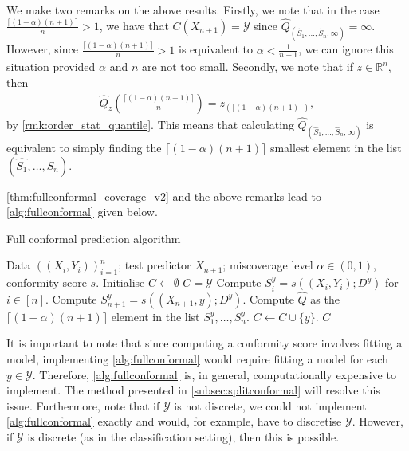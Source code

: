 \documentclass[11pt, titlepage]{article} %
\numberwithin{equation}{section}
\theoremstyle{definition}
\numberwithin{theorem}{section}
\numberwithin{lemma}{section}
\numberwithin{corollary}{section}
\numberwithin{proposition}{section}
\numberwithin{definition}{section}
\numberwithin{remark}{section}
\begin{document}
\noindent
We make two remarks on the above results. Firstly, we note that in the case \(\frac{\lceil (1-\alpha)(n+1) \rceil}{n} > 1\), we have that \(C(X_{n+1}) = \mathcal{Y}\) since \(\hat{Q}_{(\hat{S}_1, \ldots, \hat{S}_n, \infty)} = \infty\). However, since \(\frac{\lceil (1-\alpha)(n+1) \rceil}{n} > 1\) is equivalent to \(\alpha < \frac{1}{n+1}\), we can ignore this situation provided \(\alpha\) and \(n\) are not too small. Secondly, we note that if \(z \in \mathbb{R}^n\), then \begin{align*}
    \hat{Q}_z\left( \frac{\lceil (1-\alpha)(n+1) \rceil}{n} \right) = z_{(\lceil (1-\alpha)(n+1) \rceil)}, 
\end{align*} by \cref{rmk:order_stat_quantile}. This means that calculating \(\hat{Q}_{(\hat{S}_1, \ldots, \hat{S}_n, \infty)}\) is equivalent to simply finding the \(\lceil (1-\alpha)(n+1) \rceil\) smallest element in the list \((\hat{S_1}, \ldots, \hat{S}_n)\). \vskip5pt

\noindent
\cref{thm:fullconformal_coverage_v2} and the above remarks lead to \cref{alg:fullconformal} given below.


\begin{algorithm}[H]
\caption{Full conformal prediction algorithm}
\label{alg:fullconformal}
\begin{algorithmic}
    \Require Data \(((X_i, Y_i))_{i=1}^n\); test predictor \(X_{n+1}\); miscoverage level \(\alpha \in (0,1)\), conformity score \(s\).
    \State Initialise \(C \gets \emptyset\)
        \State \(C = \mathcal{Y}\)
    \Else
            \State Compute \(S_i^y = s((X_i, Y_i); D^y)\) for \(i \in [n]\).
            \State Compute \(S_{n+1}^y = s((X_{n+1}, y); D^y)\).
            \State Compute \(\hat{Q}\) as the \(\lceil (1-\alpha)(n+1) \rceil \) element in the list \(S_1^y, \ldots, S_{n}^y\).
                \State \(C \gets C \cup \{y\} \).
            \EndIf      
        \EndFor
    \EndIf
    \Ensure \(C\)
\end{algorithmic}
\end{algorithm}

\noindent
\noindent
It is important to note that since computing a conformity score involves fitting a model, implementing \cref{alg:fullconformal} would require fitting a model for each \(y \in \mathcal{Y}\). Therefore, \cref{alg:fullconformal} is, in general, computationally expensive to implement. The method presented in \cref{subsec:splitconformal} will resolve this issue. Furthermore, note that if \(\mathcal{Y}\) is not discrete, we could not implement \cref{alg:fullconformal} exactly and would, for example, have to discretise \(\mathcal{Y}\). However, if \(\mathcal{Y}\) is discrete (as in the classification setting), then this is possible.
\end{document}
